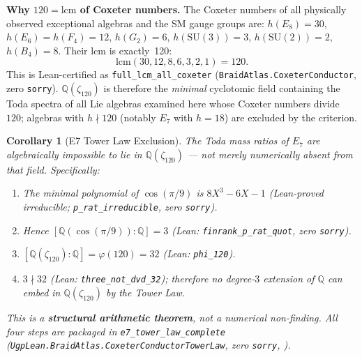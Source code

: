 \documentclass[11pt]{article}
\newtheorem{corollary}[theorem]{Corollary}
\theoremstyle{remark}
\newcommand{\zetaN}[1]{\zeta_{#1}}
\begin{document}
\noindent
\textbf{Why $120 = \mathrm{lcm}$ of Coxeter numbers.}
The Coxeter numbers of all physically observed exceptional algebras
and the SM gauge groups are:
$h(E_8)=30$, $h(E_6)=h(F_4)=12$, $h(G_2)=6$, $h(\mathrm{SU}(3))=3$,
$h(\mathrm{SU}(2))=2$, $h(B_4)=8$.  Their lcm is exactly~120:
\[
  \mathrm{lcm}(30, 12, 8, 6, 3, 2, 1) = 120.
\]
This is Lean-certified as \texttt{full\_lcm\_all\_coxeter}
(\texttt{BraidAtlas.CoxeterConductor}, zero \texttt{sorry}).
$\mathbb{Q}(\zetaN{120})$ is therefore the \emph{minimal} cyclotomic field containing the Toda spectra of all Lie algebras examined here whose Coxeter numbers divide~$120$; algebras with $h \nmid 120$ (notably $E_7$ with $h=18$) are excluded by the criterion.

\begin{corollary}[E7 Tower Law Exclusion]
\label{cor:e7_tower_law}
The Toda mass ratios of $E_7$ are \emph{algebraically impossible} to lie in
$\mathbb{Q}(\zetaN{120})$ — not merely numerically absent from that field.
Specifically:
\begin{enumerate}
  \item The minimal polynomial of $\cos(\pi/9)$ is $8X^3-6X-1$ (Lean-proved irreducible;
        \texttt{p\_rat\_irreducible}, zero \texttt{sorry}).
  \item Hence $[\mathbb{Q}(\cos(\pi/9)):\mathbb{Q}] = 3$ (Lean: \texttt{finrank\_p\_rat\_quot}, zero \texttt{sorry}).
  \item $[\mathbb{Q}(\zetaN{120}):\mathbb{Q}] = \varphi(120) = 32$ (Lean: \texttt{phi\_120}).
  \item $3 \nmid 32$ (Lean: \texttt{three\_not\_dvd\_32}); therefore no degree-$3$ extension
        of $\mathbb{Q}$ can embed in $\mathbb{Q}(\zetaN{120})$ by the Tower Law.
\end{enumerate}
This is a \textbf{structural arithmetic theorem}, not a numerical non-finding.
All four steps are packaged in \texttt{e7\_tower\_law\_complete}
(\texttt{UgpLean.BraidAtlas.CoxeterConductorTowerLaw}, zero \texttt{sorry},
\cite{ugp-lean}).
\end{corollary}
\end{document}
